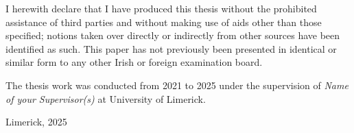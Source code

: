 


\begin{declaration}       

I herewith declare that I have produced this thesis without the prohibited assistance of third parties and without making use of aids other than those specified; notions taken over directly or indirectly from other sources have been identified as such. This paper has not previously been presented in identical or similar form to any other Irish or foreign examination board.

The thesis work was conducted from 2021 to 2025 under the supervision of \textit{Name of your Supervisor(s)} at University of Limerick.

\vspace{10mm}

Limerick, 2025

\end{declaration}


